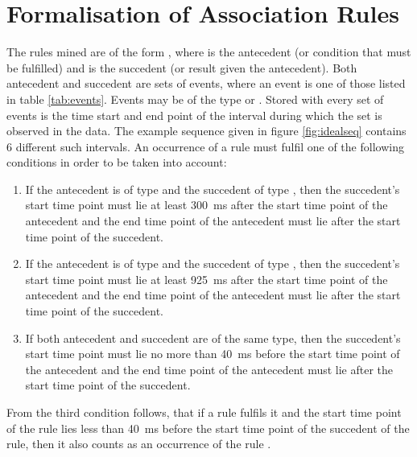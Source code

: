
\chapter{Formalisation of Association Rules}
\label{ch:formalisation}

The rules mined are of the form , where  is the antecedent (or condition that must be fulfilled) and  is the succedent (or result given the antecedent). Both antecedent and succedent are sets of events, where an event is one of those listed in table \ref{tab:events}. Events may be of the type  or . Stored with every set of events is the time start and end point of the interval during which the set is observed in the data. The example sequence given in figure \ref{fig:idealseq} contains 6 different such intervals. An occurrence of a rule must fulfil one of the following conditions in order to be taken into account:
\begin{enumerate}
	\item If the antecedent is of type  and the succedent of type , then the succedent's start time point must lie at least 300~ms after the start time point of the antecedent and the end time point of the antecedent must lie after the start time point of the succedent.
	\item If the antecedent is of type  and the succedent of type , then the succedent's start time point must lie at least 925~ms after the start time point of the antecedent and the end time point of the antecedent must lie after the start time point of the succedent.
	\item If both antecedent and succedent are of the same type, then the succedent's start time point must lie no more than 40~ms before the start time point of the antecedent and the end time point of the antecedent must lie after the start time point of the succedent.
\end{enumerate}
From the third condition follows, that if a rule  fulfils it and the start time point  of the rule lies less than 40~ms before the start time point of the succedent  of the rule, then it also counts as an occurrence of the rule .